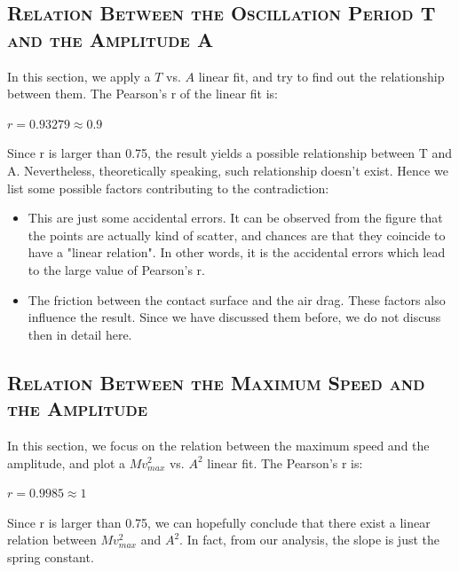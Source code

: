 \documentclass[a4paper,12pt]{article}
\begin{document}
\subsection{\textsc{Relation Between the Oscillation Period T and the Amplitude A}}
In this section, we apply a $T$ vs. $A$ linear fit, and try to find out the relationship between them. The Pearson's r of the linear fit is: 
\begin{center}
$ r = 0.93279 \approx 0.9 $
\end{center}
Since r is larger than 0.75, the result yields a possible relationship between T and A. Nevertheless, theoretically speaking, such relationship doesn't exist. Hence we list some possible factors contributing to the contradiction:
\begin{itemize}
\item This are just some accidental errors. It can be observed from the figure that the points are actually kind of scatter, and chances are that they coincide to have a "linear relation". In other words, it is the accidental errors which lead to the large value of Pearson's r.
\item The friction between the contact surface and the air drag. These factors also influence the result. Since we have discussed them before, we do not discuss then in detail here.
\end{itemize}
\subsection{\textsc{Relation Between the Maximum Speed and the Amplitude}}
In this section, we focus on the relation between the maximum speed and the amplitude, and plot a $Mv_{max}^2$ vs. $A^2$ linear fit. The Pearson's r is:
\begin{center}
$r = 0.9985 \approx 1 $
\end{center}
Since r is larger than 0.75, we can hopefully conclude that there exist a linear relation between $Mv_{max}^2$ and $A^2$. In fact, from our analysis, the slope is just the spring constant.
\end{document}
